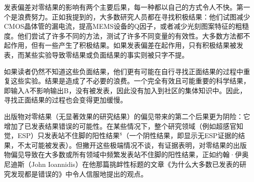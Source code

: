 发表偏差对零结果的影响有两个主要后果，每一种都以自己的方式令人不快。第一个是浪费努力。正如我提到的，大多数研究人员都在寻找积极结果：他们试图减少CMOS晶体管的漏电流，提高MEMS设备的Q因子，或者减少光刻图案特征的粗糙度。他们尝试了许多不同的方法，测试了许多不同变量的有效性。大多数方法都不起作用，但有一些产生了积极结果。如果发表偏差在起作用，只有积极结果被发表，而某些实验导致零结果或负面结果的事实则被只字不提。

如果读者仍然不知道这些负面结果，他们更有可能在自行寻找正面结果的过程中重复这些实验。结果是造成了不必要的浪费。一个完全有效且可能重要的科学结果，即输入A不影响输出B，没有被发表，因此没有加入到社区的集体知识中。因此，寻找正面结果的过程也会变得更加缓慢。

出版物对零结果（无显著效果的研究结果）的偏见带来的第二个后果更为阴险：它增加了已发表结果错误的可能性。在某些情况下，整个研究领域（例如超感官知觉，ESP）只发表站不住脚的阳性结果${ }^{8}$（一个阴性结果，即显示无ESP证据的结果，不太可能被发表）。但撇开这些极端情况不谈，有证据表明，对零结果的出版物偏见导致在大多数或所有领域中频繁发表站不住脚的阳性结果，正如约翰·伊奥尼迪斯（John Ioannidis）在他那篇挑衅性标题的文章《为什么大多数已发表的研究发现都是错误的》中令人信服地提出的观点。

